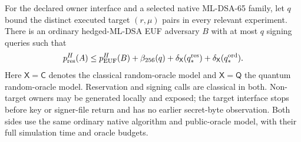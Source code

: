 \begin{theorem}
\label{thm:native-mldsa-reservation-bridge}
For the declared owner interface and a selected native ML-DSA-65 family,
let $q$ bound the distinct executed target $(r,\mu)$ pairs in every
relevant experiment. There is an ordinary hedged-ML-DSA EUF adversary $B$ with at most $q$
signing queries such that
\begin{equation}
 p_{\rm res}^{H}(A)
 \le p_{\rm EUF}^{H}(B)+\beta_{256}(q)
       +\delta_{\mathsf X}(q_*^{\rm res})
       +\delta_{\mathsf X}(q_*^{\rm ord}).
 \label{eq:native-mldsa-reservation-bridge}
\end{equation}
Here $\mathsf X=\mathsf C$ denotes the classical random-oracle model and
$\mathsf X=\mathsf Q$ the quantum random-oracle model. Reservation and
signing calls are classical in both. Non-target owners may be generated
locally and exposed; the target interface stops before key or signer-file
return and has no earlier secret-byte observation. Both sides use the
same ordinary native algorithm and public-oracle model, with their full
simulation time and oracle budgets.
\end{theorem}
